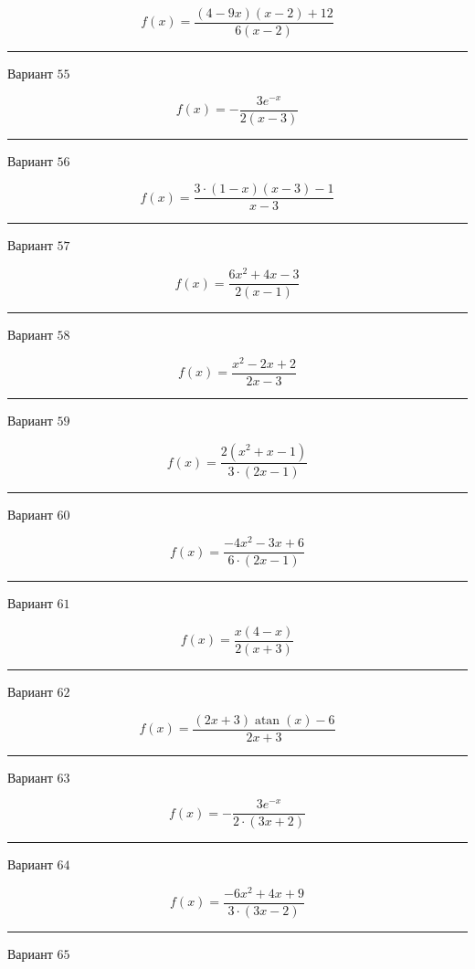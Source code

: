 \documentclass[11pt]{report}
\begin{document}
$$f(x) = \frac{\left(4 - 9 x\right) \left(x - 2\right) + 12}{6 \left(x - 2\right)}$$
\begin{center}
\noindent\rule{8cm}{0.4pt}
\end{center}
Вариант $55$


$$f(x) = - \frac{3 e^{- x}}{2 \left(x - 3\right)}$$
\begin{center}
\noindent\rule{8cm}{0.4pt}
\end{center}
Вариант $56$


$$f(x) = \frac{3 \cdot \left(1 - x\right) \left(x - 3\right) - 1}{x - 3}$$
\begin{center}
\noindent\rule{8cm}{0.4pt}
\end{center}
Вариант $57$


$$f(x) = \frac{6 x^{2} + 4 x - 3}{2 \left(x - 1\right)}$$
\begin{center}
\noindent\rule{8cm}{0.4pt}
\end{center}
Вариант $58$


$$f(x) = \frac{x^{2} - 2 x + 2}{2 x - 3}$$
\begin{center}
\noindent\rule{8cm}{0.4pt}
\end{center}
Вариант $59$


$$f(x) = \frac{2 \left(x^{2} + x - 1\right)}{3 \cdot \left(2 x - 1\right)}$$
\begin{center}
\noindent\rule{8cm}{0.4pt}
\end{center}
Вариант $60$


$$f(x) = \frac{- 4 x^{2} - 3 x + 6}{6 \cdot \left(2 x - 1\right)}$$
\begin{center}
\noindent\rule{8cm}{0.4pt}
\end{center}
Вариант $61$


$$f(x) = \frac{x \left(4 - x\right)}{2 \left(x + 3\right)}$$
\begin{center}
\noindent\rule{8cm}{0.4pt}
\end{center}
Вариант $62$


$$f(x) = \frac{\left(2 x + 3\right) \operatorname{atan}{\left(x \right)} - 6}{2 x + 3}$$
\begin{center}
\noindent\rule{8cm}{0.4pt}
\end{center}
Вариант $63$


$$f(x) = - \frac{3 e^{- x}}{2 \cdot \left(3 x + 2\right)}$$
\begin{center}
\noindent\rule{8cm}{0.4pt}
\end{center}
Вариант $64$


$$f(x) = \frac{- 6 x^{2} + 4 x + 9}{3 \cdot \left(3 x - 2\right)}$$
\begin{center}
\noindent\rule{8cm}{0.4pt}
\end{center}
Вариант $65$
\end{document}
